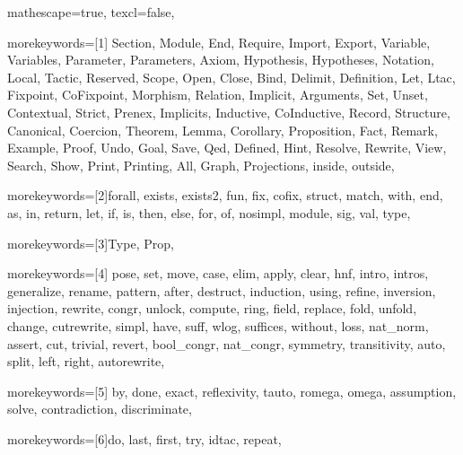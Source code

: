 
 {

mathescape=true,						
texcl=false,


morekeywords=[1]{
Section, Module, End, Require, Import, Export,
Variable, Variables, Parameter, Parameters, Axiom, Hypothesis, Hypotheses,
Notation, Local, Tactic, Reserved, Scope, Open, Close, Bind, Delimit,
Definition, Let, Ltac, Fixpoint, CoFixpoint, Morphism, Relation,
Implicit, Arguments, Set, Unset, Contextual, Strict, Prenex, Implicits,
Inductive, CoInductive, Record, Structure, Canonical, Coercion,
Theorem, Lemma, Corollary, Proposition, Fact, Remark, Example,
Proof, Undo, Goal, Save, Qed, Defined, Hint, Resolve, Rewrite, View,
Search, Show, Print, Printing, All, Graph, Projections, inside, outside},

morekeywords=[2]{forall, exists, exists2, fun, fix, cofix, struct,
      match, with, end, as, in, return, let, if, is, then, else,
      for, of, nosimpl, module, sig, val, type},

morekeywords=[3]{Type, Prop},

morekeywords=[4]{
         pose, set, move, case, elim, apply, clear,
            hnf, intro, intros, generalize, rename, pattern, after,
	    destruct, induction, using, refine, inversion, injection,
         rewrite, congr, unlock, compute, ring, field,
            replace, fold, unfold, change, cutrewrite, simpl,
         have, suff, wlog, suffices, without, loss, nat_norm,
            assert, cut, trivial, revert, bool_congr, nat_congr,
	 symmetry, transitivity, auto, split, left, right, autorewrite},        

morekeywords=[5]{
         by, done, exact, reflexivity, tauto, romega, omega,
         assumption, solve, contradiction, discriminate},


morekeywords=[6]{do, last, first, try, idtac, repeat},


}
